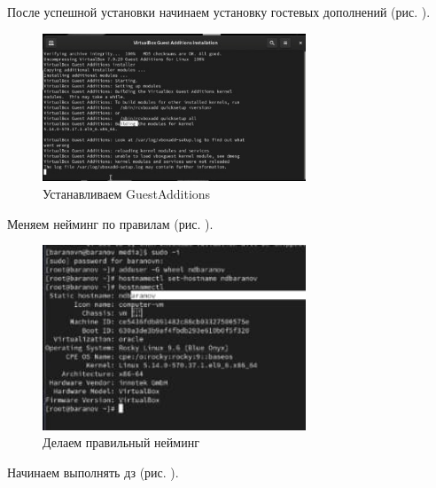 \documentclass[
  12pt,
  a4paper,
  DIV=11,
  numbers=noendperiod]{scrreprt}
\begin{document}
После успешной установки начинаем установку гостевых дополнений (рис.
\autocite*{fig:005}).

\begin{figure}

{\centering \includegraphics[width=0.7\textwidth,height=\textheight]{image/5.jpg}

}

\caption{Устанавливаем GuestAdditions}

\end{figure}%

Меняем нейминг по правилам (рис. \autocite*{fig:006}).

\begin{figure}

{\centering \includegraphics[width=0.7\textwidth,height=\textheight]{image/6.jpg}

}

\caption{Делаем правильный нейминг}

\end{figure}%

Начинаем выполнять дз (рис. \autocite*{fig:007}).
\end{document}
